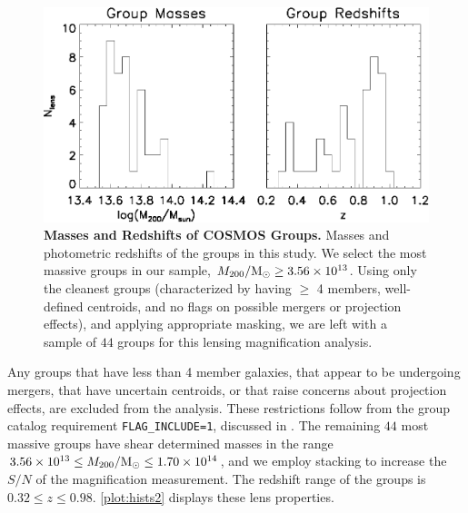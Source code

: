 \begin{figure}
\begin{center}
\includegraphics[scale=1.0]{plots_ch2/m200_zphot_histograms_44x.eps}
\caption[Masses and Redshifts of \ac{COSMOS} Groups]{{\bf Masses and Redshifts of \ac{COSMOS} Groups.} Masses and photometric redshifts of the groups in this study.  We select the most massive groups in our sample, $M_{200} / {\rm M}_\odot \ge 3.56 \times 10^{13}$. Using only the cleanest groups (characterized by having $\ge$ 4 members, well-defined centroids, and no flags on possible mergers or projection effects), and applying appropriate masking, we are left with a sample of $44$ groups for this lensing magnification analysis.}
\label{plot:hists2}
\end{center}
\end{figure}

Any groups that have less than 4 member galaxies, that appear to be undergoing mergers, that have uncertain centroids, or that raise concerns about projection effects, are excluded from the analysis. These restrictions follow from the group catalog requirement \texttt{FLAG\_INCLUDE=1}, discussed in \citet{George11}. The remaining $44$ most massive groups have shear determined masses in the range $ 3.56 \times 10^{13} \le M_{200} / {\rm M}_\odot \le 1.70 \times 10^{14} $, and we employ stacking to increase the $S/N$ of the magnification measurement.  The redshift range of the groups is $ 0.32 \le z \le 0.98 $. \autoref{plot:hists2} displays these lens properties.

